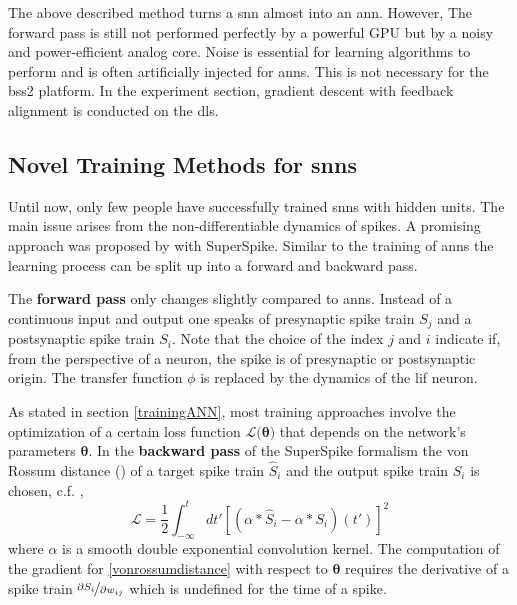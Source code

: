 The above described method turns a \gls{snn} almost into an \gls{ann}. However, The forward pass is still not performed perfectly by a powerful GPU but by a noisy and power-efficient analog core. Noise is essential for learning algorithms to perform and is often artificially injected for \glspl{ann}. This is not necessary for the \gls{bss2} platform. In the experiment section, gradient descent with feedback alignment is conducted on the \gls{dls}.


\subsection{Novel Training Methods for \glspl{snn}}
\label{superspike}


Until now, only few people have successfully trained \glspl{snn} with hidden units. The main issue arises from the non-differentiable dynamics of spikes. A promising approach was proposed by \cite{zenke2018superspike} with SuperSpike. Similar to the training of \glspl{ann} the learning process can be split up into a forward and backward pass. 

The \textbf{forward pass} only changes slightly compared to \glspl{ann}. Instead of a continuous input and output one speaks of presynaptic spike train $S_j$ and a postsynaptic spike train $S_i$. Note that the choice of the index $j$ and $i$ indicate if, from the perspective of a neuron, the spike is of presynaptic or postsynaptic origin. The transfer function $\phi$ is replaced by the dynamics of the \gls{lif} neuron.


As stated in section \ref{trainingANN}, most training approaches involve the optimization of a certain loss function $\mathcal{L(\mathbf{\theta)}}$ that depends on the network's parameters $\mathbf{\theta}$. In the \textbf{backward pass} of the SuperSpike formalism the von Rossum distance (\cite{rossum01novel}) of a target spike train $\hat{S}_i$ and the output spike train $S_i$ is chosen, c.f. \cite{zenke2018superspike},
\begin{equation}
\label{vonrossumdistance}
\mathcal{L} = \frac{1}{2} \int^t_{-\infty}dt' \left[\left(\alpha \ast \hat{S}_i - \alpha \ast S_i \right)(t')\right]^2
\end{equation}
where $\alpha$ is a smooth double exponential convolution kernel. The computation of the gradient for \ref{vonrossumdistance} with respect to $\mathbf{\theta}$ requires the derivative of a spike train $\nicefrac{\partial{S_i}}{\partial{w_{ij}}}$ which is undefined for the time of a spike. 

